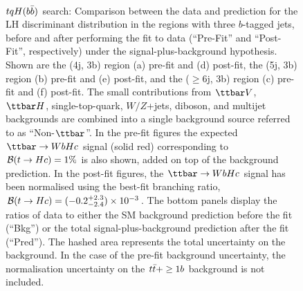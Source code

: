 \begin{figure}[htbp]
\begin{center}
 \\
\caption{\small{$tqH(b\bar{b})$ search: Comparison between the data and prediction for the LH discriminant distribution in the regions with three $b$-tagged jets, 
before and after performing the fit to data  (``Pre-Fit'' and ``Post-Fit'', respectively) under the signal-plus-background hypothesis.
Shown are the (4j, 3b) region (a) pre-fit and (d) post-fit,  the (5j, 3b) region (b) pre-fit and (e) post-fit, and
the ($\geq$6j, 3b) region (c) pre-fit and (f) post-fit.
The small contributions from $\ttbar V$, $\ttbar H$, single-top-quark, $W/Z$+jets, diboson, and multijet backgrounds are combined into a single background source 
referred to as ``Non-$\ttbar$''. 
In the pre-fit figures the expected $\Hc$ signal (solid red) corresponding to $\mathcal{B}(t\to Hc)=1\%$ is also shown,
added on top of the background prediction. In the post-fit figures, the $\Hc$ signal has been normalised using the best-fit branching ratio, 
$\mathcal{B}(t\to Hc)=(-0.2^{+2.3}_{-2.4}) \times 10^{-3}$.
The bottom panels display the ratios of data to either the SM background prediction before the fit (``Bkg'')  or the total signal-plus-background
prediction after the fit (``Pred''). 
The hashed area represents the total uncertainty on the background.
In the case of the pre-fit background uncertainty, the normalisation uncertainty on the $t\bar{t}+\geq1b$ background is not included. }}
\label{fig:prepostfit_unblinded_WbHc_3btagex}
\end{center}
\end{figure}

